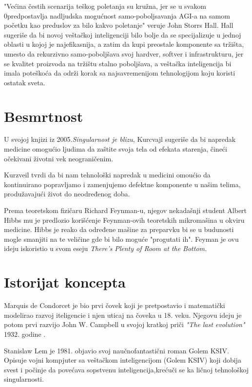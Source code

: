 \documentclass[a4paper]{article}
\begin{document}
"Većina čestih scenarija teškog poletanja su kružna, jer se u svakom 0predpostavlja nadljudska mogućnost samo-poboljsavanja AGI-a na samom početku kao preduslov za bilo kakvo poletanje" veruje John Storrs Hall. Hall sugeriše da bi novoj veštačkoj inteligenciji bilo bolje da se specijalizuje u jednoj oblasti u kojoj je najefikasnija, a zatim da kupi preostale komponente sa tržišta, umesto da rekurzivno samo-poboljšava svoj hardver, softver i infrastrukturu, jer se kvalitet proizvoda na tržištu stalno poboljšava, a veštačka inteligencija bi imala poteškoća da održi korak sa najsavremenijom tehnologijom koju koristi ostatak sveta.\cite{refe3}

\section{Besmrtnost}
\label{sec:besmrtnost}
  U svojoj knjizi iz 2005.\textit {Singularnost je blizu}, Kurcvajl sugeriše da bi napredak medicine omogućio ljudima da zaštite svoja tela od efekata starenja, čineći očekivani životni vek neograničenim. 
  
  Kurzveil tvrdi da bi nam tehnološki napredak u medicini omoućio da kontinuirano popravljamo i zamenjujemo defektne komponente u našim telima, produžavajući život do neodređenog doba.

  Prema teoretskom fizičaru  Richard Feynman-u, njegov nekadašnji student Albert Hibbs mu je predlozio korišćenje Feynman-ovih teoretskih mikromašina u okviru medicine. Hibbs je reako da određene mašine za preparvku bi se u budunosti mogle smanjiti na te veličine gde bi bilo moguće "progutati ih". Feyman je ovu ideju iskoristio u svom eseju \textit{ There's Plenty of Room at the Bottom.}\cite{refe4}
\section{Istorijat koncepta}
\label{sec:istorijat}

Marquis de Condorcet je bio prvi čovek koji je pretpostavio i matematički modelirao razvoj iteligencie i njen uticaj na čoveka u 18. veku. Njegovu ideju je potom prvi razvijo John W. Campbell u svojoj kratkoj priči\textit{ "The last evolution"} 1932. godine .\cite{refe5}

Stanislaw Lem je 1981. objavio svoj naučnofantastični roman Golem KSIV. Opisuje vojni kompjuter sa veštačkom inteligencijom (Golem KSIV) koji dobija svest i počinje da povećava sopstvenu inteligencija,krećuči se ka ličnoj tehnološkoj singularnosti.\cite{refe6}
\end{document}
